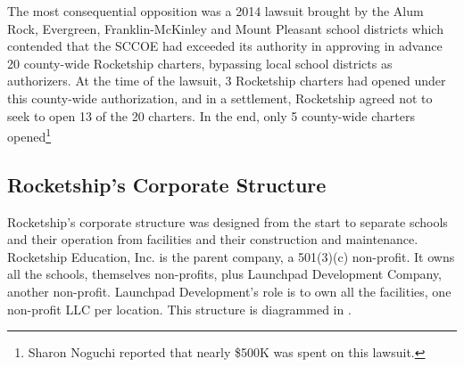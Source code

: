The most consequential opposition was a 2014 lawsuit brought by the Alum Rock, Evergreen, Franklin-McKinley and Mount Pleasant school districts which contended that the SCCOE had exceeded its authority in approving in advance 20 county-wide Rocketship charters, bypassing local school districts as authorizers. At the time of the lawsuit, 3 Rocketship charters had opened under this county-wide authorization, and in a settlement, Rocketship agreed not to seek to open 13 of the 20 charters. In the end, only 5 county-wide charters opened\footnote{Sharon Noguchi reported that nearly \$500K was spent on this lawsuit\parencite{Noguchi2015}.}

\subsection{Rocketship's Corporate Structure}\label{sec:rocketship-corp-struct}\indent

Rocketship's corporate structure was designed from the start to separate schools and their operation from facilities and their construction and maintenance. Rocketship Education, Inc. is the parent company, a 501(3)(c) non-profit. It owns all the schools, themselves non-profits, plus Launchpad Development Company, another non-profit. Launchpad Development's role is to own all the facilities, one non-profit LLC per location. This structure is diagrammed in .


